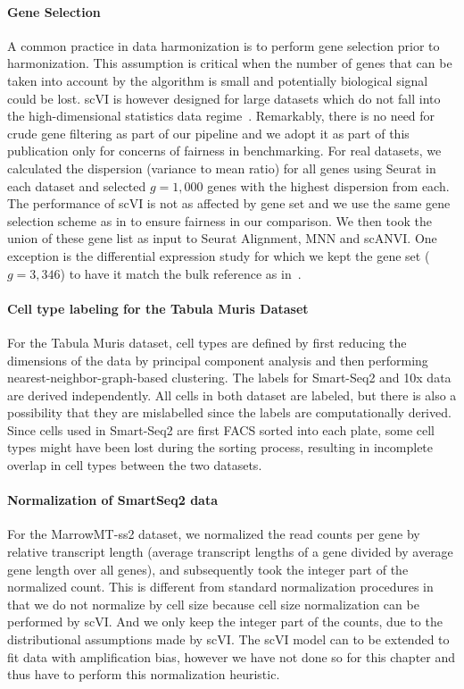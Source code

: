 \paragraph{Gene Selection}
A common practice in data harmonization is to perform gene selection prior to harmonization. This assumption is critical when the number of genes that can be taken into account by the algorithm is small and potentially biological signal could be lost. scVI is however designed for large datasets which do not fall into the high-dimensional statistics data regime~\cite{scvi}. Remarkably, there is no need for crude gene filtering as part of our pipeline and we adopt it as part of this publication only for concerns of fairness in benchmarking. For real datasets, we calculated the dispersion (variance to mean ratio) for all genes using Seurat in each dataset and selected $g = 1,000$ genes with the highest dispersion from each. The performance of scVI is not as affected by gene set and we use the same gene selection scheme as in \cite{seurat} to ensure fairness in our comparison. We then took the union of these gene list as input to Seurat Alignment, MNN and scANVI. One exception is the differential expression study for which we kept the gene set ($g=3,346$) to have it match the bulk reference as in~\cite{scvi}. 

\paragraph{Cell type labeling for the Tabula Muris Dataset} 
For the Tabula Muris dataset, cell types are defined by first reducing the dimensions of the data by principal component analysis and then performing nearest-neighbor-graph-based clustering. The labels for Smart-Seq2 and 10x data are derived independently. All cells in both dataset are labeled, but there is also a possibility that they are mislabelled since the labels are computationally derived. Since cells used in Smart-Seq2 are first FACS sorted into each plate, some cell types might have been lost during the sorting process, resulting in incomplete overlap in cell types between the two datasets.

\paragraph{Normalization of SmartSeq2 data} For the MarrowMT-ss2 dataset, we normalized the read counts per gene by relative transcript length (average transcript lengths of a gene divided by average gene length over all genes), and subsequently took the integer part of the normalized count. This is different from standard normalization procedures in that we do not normalize by cell size because cell size normalization can be performed by scVI. And we only keep the integer part of the counts, due to the distributional assumptions made by scVI. The scVI model can to be extended to fit data with amplification bias, however we have not done so for this chapter and thus have to perform this normalization heuristic. 


